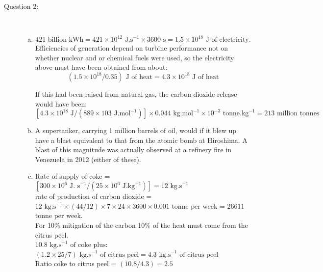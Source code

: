 \documentclass[12pt,twoside]{report}
\begin{document}
\begin{description}
\begin{enumerate}[(a)]
\end{enumerate}

\clearpage

\item [Question 2:] \mbox{}\\
 
\begin{enumerate}[(a)]
\item 
\begin{displaymath}
421 \text{ billion kWh} = 421 \times 10^{12}  \text{ J.s}^{-1} \times 3600 \text{ s}  = 1.5 \times 10^{18} \text{ J of electricity.}
\end{displaymath}
Efficiencies of generation depend on turbine performance not on whether nuclear and or chemical fuels were used, so the electricity above must have been obtained from about: 
\begin{displaymath}
    \left(1.5 \times 10^{18} / 0.35\right) \text{ J of heat} =  4.3 \times 10^{18} \text{ J  of heat}
\end{displaymath}

If this had been raised from natural gas, the carbon dioxide release would have been: 
\begin{displaymath}                              
\left[ 4.3 \times 10^{18} \text{ J} / \left(889 × 103 \text{ J.mol}^{-1}\right)\right] \times 0.044 \text{ kg.mol}^{-1} \times 10^{-3} \text{ tonne.kg}^{-1} = 213 \text{ million tonnes}
\end{displaymath}

\item A supertanker, carrying 1 million barrels of oil, would if it blew up have a blast equivalent to that from the atomic bomb at Hiroshima. A blast of this magnitude was actually observed at a refinery fire in Venezuela in 2012 (either of these). 

\item Rate  of supply of coke = $\left[ 300 \times 10^{6}  \text{ J. s}^{-1} / \left( 25 \times 10^{6} \text{ J.kg}^{-1}\right)\right]  = 12 \text{ kg.s}^{-1}$\\ 
 rate of production of carbon dioxide = $12 \text{ kg.s}^{-1} \times \left( 44 / 12\right) \times 7 \times 24 \times 3600 \times 0.001 \text{ tonne per week}$ = $26611$ tonne per week. \\

For 10$\%$ mitigation of the carbon  10$\%$ of the heat must come from the citrus peel.\\
$10.8 \text{ kg.s}^{-1} \text{ of coke plus:}$ \\
$\left( 1.2 \times 25/7\right) \text{ kg.s}^{-1} \text{ of citrus peel} = 4.3 \text{ kg.s}^{-1} \text{ of citrus peel}$ \\ 
Ratio coke to citrus peel = $\left(10.8 / 4.3\right) = 2.5$ 


\end{enumerate}
\end{description}
\end{document}

